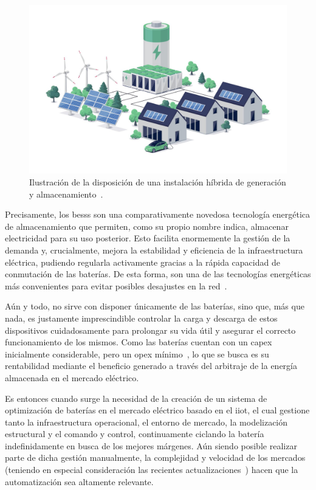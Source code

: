 \begin{figure}
  \centering
  \includegraphics[width=0.5\linewidth]{figures/instalacion-bess.jpg}
  \caption[Ilustración de la disposición de una instalación híbrida.]{Ilustración de la disposición de una instalación híbrida de generación y almacenamiento~\cite{deutz2023what}.}%
  \label{fig:instalacion-bess}
\end{figure}

Precisamente, los \glspl{bess} son una comparativamente novedosa tecnología energética de almacenamiento que permiten, como su propio nombre indica, almacenar electricidad para su uso posterior. Esto facilita enormemente la gestión de la demanda y, crucialmente, mejora la estabilidad y eficiencia de la infraestructura eléctrica, pudiendo regularla activamente gracias a la rápida capacidad de conmutación de las baterías. De esta forma, son una de las tecnologías energéticas más convenientes para evitar posibles desajustes en la red~\cite{xu2014bess}.

Aún y todo, no sirve con disponer únicamente de las baterías, sino que, más que nada, es justamente imprescindible controlar la carga y descarga de estos dispositivos cuidadosamente para prolongar su vida útil y asegurar el correcto funcionamiento de los mismos. Como las baterías cuentan con un \gls{capex} inicialmente considerable, pero un \gls{opex} mínimo~\cite{larsson2018cost}, lo que se busca es su rentabilidad mediante el beneficio generado a través del arbitraje de la energía almacenada en el mercado eléctrico.

Es entonces cuando surge la necesidad de la creación de un sistema de optimización de baterías en el mercado eléctrico basado en el \gls{iiot}, el cual gestione tanto la infraestructura operacional, el entorno de mercado, la modelización estructural y el comando y control, continuamente ciclando la batería indefinidamente en busca de los mejores márgenes. Aún siendo posible realizar parte de dicha gestión manualmente, la complejidad y velocidad de los mercados (teniendo en especial consideración las recientes actualizaciones~\cite{cnmc2025resolucion, omie2025instruccion}) hacen que la automatización sea altamente relevante.

